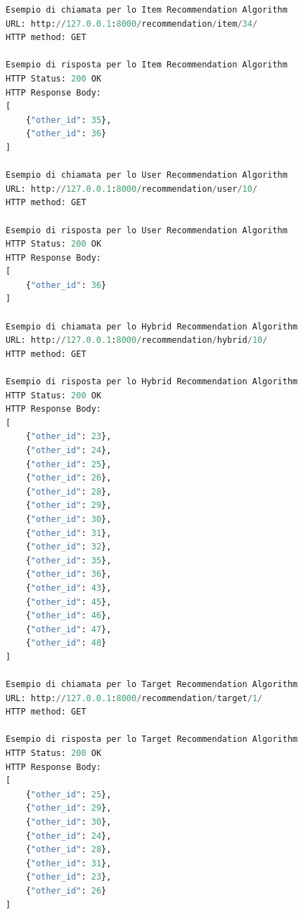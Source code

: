 \begin{lstlisting}[language=Python, label=lst:view_rec_ex, caption={Esempi di chiamata e risposta HTTP per i diversi algoritmi di raccomandazione.}]
Esempio di chiamata per lo Item Recommendation Algorithm
URL: http://127.0.0.1:8000/recommendation/item/34/ 
HTTP method: GET
 
Esempio di risposta per lo Item Recommendation Algorithm
HTTP Status: 200 OK
HTTP Response Body:
[
    {"other_id": 35},
    {"other_id": 36}
]
 
Esempio di chiamata per lo User Recommendation Algorithm
URL: http://127.0.0.1:8000/recommendation/user/10/ 
HTTP method: GET
 
Esempio di risposta per lo User Recommendation Algorithm
HTTP Status: 200 OK
HTTP Response Body:
[
    {"other_id": 36}
]
 
Esempio di chiamata per lo Hybrid Recommendation Algorithm
URL: http://127.0.0.1:8000/recommendation/hybrid/10/ 
HTTP method: GET
 
Esempio di risposta per lo Hybrid Recommendation Algorithm
HTTP Status: 200 OK
HTTP Response Body:
[
    {"other_id": 23},
    {"other_id": 24},
    {"other_id": 25},
    {"other_id": 26},
    {"other_id": 28},
    {"other_id": 29},
    {"other_id": 30},
    {"other_id": 31},
    {"other_id": 32},
    {"other_id": 35},
    {"other_id": 36},
    {"other_id": 43},
    {"other_id": 45},
    {"other_id": 46},
    {"other_id": 47},
    {"other_id": 48}
]
 
Esempio di chiamata per lo Target Recommendation Algorithm
URL: http://127.0.0.1:8000/recommendation/target/1/ 
HTTP method: GET
 
Esempio di risposta per lo Target Recommendation Algorithm
HTTP Status: 200 OK
HTTP Response Body:
[
    {"other_id": 25},
    {"other_id": 29},
    {"other_id": 30},
    {"other_id": 24},
    {"other_id": 28},
    {"other_id": 31},
    {"other_id": 23},
    {"other_id": 26}
]
\end{lstlisting}
